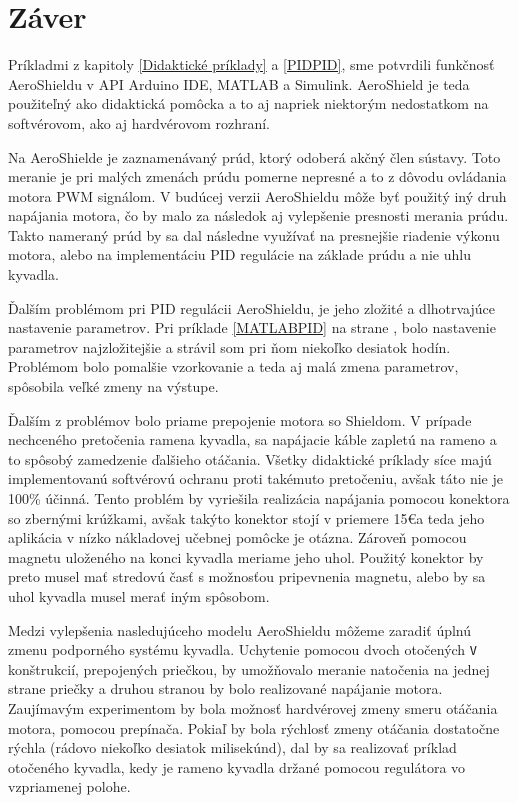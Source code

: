 \chapter{Záver}

Príkladmi z kapitoly \ref{Didaktické príklady} a \ref{PIDPID}, sme potvrdili funkčnosť AeroShieldu v API Arduino IDE, MATLAB a Simulink. AeroShield je teda použiteľný ako didaktická pomôcka a to aj napriek niektorým nedostatkom na softvérovom, ako aj hardvérovom rozhraní. 

Na AeroShielde je zaznamenávaný prúd, ktorý odoberá akčný člen sústavy. Toto meranie je pri malých zmenách prúdu pomerne nepresné a to z dôvodu ovládania motora PWM signálom. V budúcej verzii AeroShieldu môže byť použitý iný druh napájania motora, čo by malo za následok aj vylepšenie presnosti merania prúdu. Takto nameraný prúd by sa dal následne využívať na presnejšie riadenie výkonu motora, alebo na implementáciu PID regulácie na základe prúdu a nie uhlu kyvadla. 

Ďalším problémom pri PID regulácii AeroShieldu, je jeho zložité a dlhotrvajúce nastavenie parametrov. Pri príklade \ref{MATLABPID} na strane \pageref{MATLABPID}, bolo nastavenie parametrov najzložitejšie a strávil som pri ňom niekoľko desiatok hodín. Problémom bolo pomalšie vzorkovanie a teda aj malá zmena parametrov, spôsobila veľké zmeny na výstupe. 

Ďalším z problémov bolo priame prepojenie motora so Shieldom. V prípade nechceného pretočenia ramena kyvadla, sa napájacie káble zapletú na rameno a to spôsobý zamedzenie ďalšieho otáčania. Všetky didaktické príklady síce majú implementovanú softvérovú ochranu proti takémuto pretočeniu, avšak táto nie je 100\% účinná. 
Tento problém by vyriešila realizácia napájania pomocou konektora so zbernými krúžkami, avšak takýto konektor stojí v priemere 15\euro  a teda jeho aplikácia v nízko nákladovej učebnej pomôcke je otázna. Zároveň pomocou magnetu uloženého na konci kyvadla meriame jeho uhol. Použitý konektor by preto musel mať stredovú časť s možnosťou pripevnenia magnetu, alebo by sa uhol kyvadla musel merať iným spôsobom. 

Medzi vylepšenia nasledujúceho modelu AeroShieldu môžeme zaradiť úplnú zmenu podporného systému kyvadla. Uchytenie pomocou dvoch otočených \verb|V| konštrukcií, prepojených priečkou, by umožňovalo meranie natočenia na jednej strane priečky a druhou stranou by bolo realizované napájanie motora. Zaujímavým experimentom by bola možnosť hardvérovej zmeny smeru otáčania motora, pomocou prepínača. Pokiaľ by bola rýchlosť zmeny otáčania dostatočne rýchla (rádovo niekoľko desiatok milisekúnd), dal by sa realizovať príklad otočeného kyvadla, kedy je rameno kyvadla držané pomocou regulátora vo vzpriamenej polohe.   

